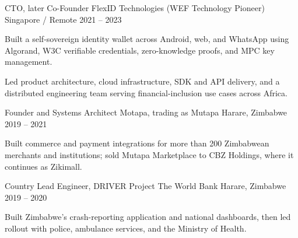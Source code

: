 \begin{cventries}
\cventry
  {CTO, later Co-Founder}
  {FlexID Technologies (WEF Technology Pioneer)}
  {Singapore / Remote}
  {2021 -- 2023}
  {
    \begin{cvitems}
      \item {Built a self-sovereign identity wallet across Android, web, and WhatsApp using Algorand, W3C verifiable credentials, zero-knowledge proofs, and MPC key management.}
      \item {Led product architecture, cloud infrastructure, SDK and API delivery, and a distributed engineering team serving financial-inclusion use cases across Africa.}
    \end{cvitems}
  }

\cventry
  {Founder and Systems Architect}
  {Motapa, trading as Mutapa}
  {Harare, Zimbabwe}
  {2019 -- 2021}
  {
    \begin{cvitems}
      \item {Built commerce and payment integrations for more than 200 Zimbabwean merchants and institutions; sold Mutapa Marketplace to CBZ Holdings, where it continues as Zikimall.}
    \end{cvitems}
  }

\cventry
  {Country Lead Engineer, DRIVER Project}
  {The World Bank}
  {Harare, Zimbabwe}
  {2019 -- 2020}
  {
    \begin{cvitems}
      \item {Built Zimbabwe's crash-reporting application and national dashboards, then led rollout with police, ambulance services, and the Ministry of Health.}
    \end{cvitems}
  }

\end{cventries}
